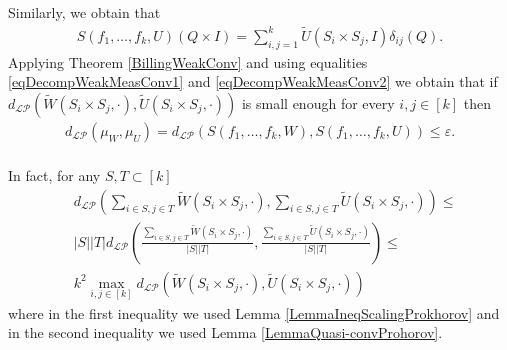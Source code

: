\documentclass[11pt]{article}
\begin{document}
Similarly, we obtain that 
\begin{equation}\label{eqDecompWeakMeasConv2}
    \begin{aligned}
S(f_1,\ldots,f_k,U)(Q\times I)=
 \sum^k_{i,j=1}\widetilde U(S_i\times S_j,I)\delta_{ij}(Q).
\end{aligned}
\end{equation}
Applying  Theorem \ref{BillingWeakConv} and using equalities \eqref{eqDecompWeakMeasConv1} and \eqref{eqDecompWeakMeasConv2} we obtain that if $d_{\mathcal{LP}}(\widetilde W(S_i\times S_j,\cdot),\widetilde U(S_i\times S_j,\cdot))$ is small enough for every $i,j\in [k]$ then
$$
\begin{aligned}
d_{\mathcal{LP}}(\mu_W,\mu_U)=
 d_{\mathcal{LP}}(S(f_1,\ldots,f_k,W),S(f_1,\ldots,f_k,U))\leq \varepsilon.\\
\end{aligned}
$$

In fact, for any $S,T\subset [k]$
\begin{equation}
    \begin{aligned}
&d_{\mathcal{LP}}( \sum_{i\in S,j\in T}\widetilde W(S_i\times S_j,\cdot),\sum_{i\in S,j\in T}\widetilde U(S_i\times S_j,\cdot))\leq \\
& |S||T|d_{\mathcal{LP}}\left(\frac{ \sum_{i\in S,j\in T}\widetilde W(S_i\times S_j,\cdot)}{|S||T|},\frac{\sum_{i\in S,j\in T}\widetilde U(S_i\times S_j,\cdot)}{|S||T|}\right)\leq\\
& k^2 \max_{i,j\in [k]}d_{\mathcal{LP}}\left(\widetilde W(S_i\times S_j,\cdot),\widetilde U(S_i\times S_j,\cdot)\right)
\end{aligned}
\end{equation}
where in the first inequality we used Lemma \ref{LemmaIneqScalingProkhorov} and in the second inequality we used Lemma \ref{LemmaQuasi-convProhorov}.
\end{document}
